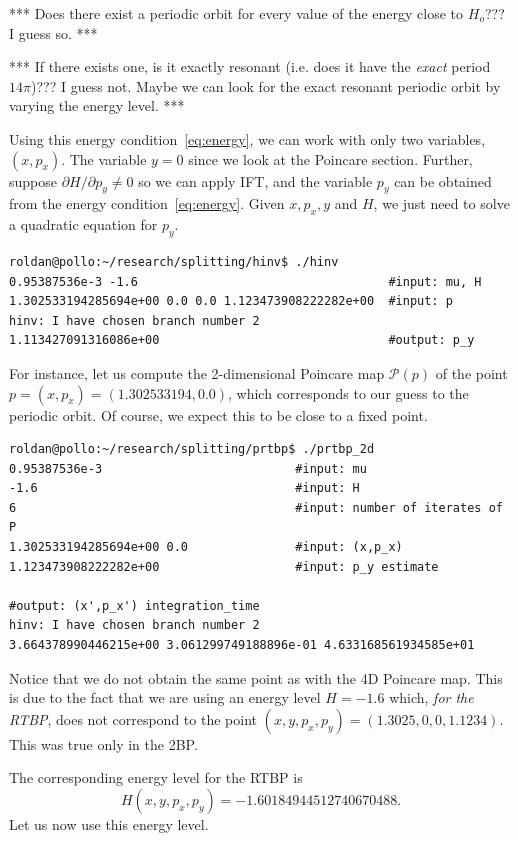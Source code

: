 \documentclass[a4paper]{amsart}
\theoremstyle{remark}
\newcommand{\sixmap}{\mathcal{P}}
\begin{document}
*** Does there exist a periodic orbit for every value of the energy
close to $H_o$??? I guess so. ***

*** If there exists one, is it exactly resonant (i.e. does it have the
\emph{exact} period $14\pi$)??? I guess not. Maybe we can look for the exact
resonant periodic orbit by varying the energy level.
***

Using this energy condition~\eqref{eq:energy}, we can work with only two
variables, $(x,p_x)$.
The variable $y=0$ since we look at the Poincare section. Further, suppose
$\partial H/\partial p_y \neq 0$ so we can apply IFT, and the variable $p_y$
can be obtained from the energy condition~\eqref{eq:energy}. 
Given $x,p_x,y$ and $H$, we just need to solve a quadratic equation for
$p_y$.

\begin{verbatim}
roldan@pollo:~/research/splitting/hinv$ ./hinv 
0.95387536e-3 -1.6                                   #input: mu, H
1.302533194285694e+00 0.0 0.0 1.123473908222282e+00  #input: p
hinv: I have chosen branch number 2
1.113427091316086e+00                                #output: p_y
\end{verbatim}

For instance, let us compute the 2-dimensional Poincare map
$\sixmap(p)$ of the point $p=(x,p_x)=(1.302533194,0.0)$, which
corresponds to our guess to the periodic orbit. 
Of course, we expect this to be close to a fixed point.

\begin{verbatim}
roldan@pollo:~/research/splitting/prtbp$ ./prtbp_2d
0.95387536e-3                           #input: mu 
-1.6                                    #input: H
6                                       #input: number of iterates of P
1.302533194285694e+00 0.0               #input: (x,p_x) 
1.123473908222282e+00                   #input: p_y estimate

#output: (x',p_x') integration_time
hinv: I have chosen branch number 2
3.664378990446215e+00 3.061299749188896e-01 4.633168561934585e+01
\end{verbatim}
Notice that we do not obtain the same point as with the 4D Poincare
map. This is due to the fact that we are using an energy level
$H=-1.6$ which, \emph{for the RTBP}, does not correspond to the point
$(x,y,p_x,p_y) = (1.3025, 0, 0, 1.1234)$. This was true only in the 2BP.

The corresponding energy level for the RTBP is 
\[ H(x,y,p_x,p_y) = -1.60184944512740670488. \]
 Let us now use this energy level.
\end{document}

